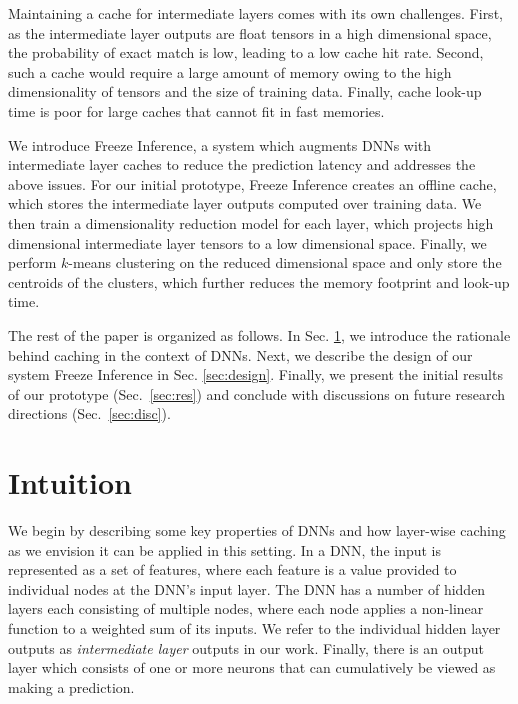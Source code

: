 \documentclass[letterpaper,twocolumn,10pt]{article}
\newcommand{\adarsh}[1]{}
\renewcommand{\adarsh}[1]{{\color{brown}{\bf [AK: #1}]}}
\begin{document}
Maintaining a cache for intermediate layers comes with its own challenges. First, as the intermediate layer outputs are float tensors in a high dimensional space, the probability of exact match is low, leading to a low cache hit rate. Second, such a cache would require a large amount of memory owing to the high dimensionality of tensors and the size of training data. Finally, cache look-up time is poor for large caches that cannot fit in fast memories. 

We introduce Freeze Inference, a system which augments DNNs with intermediate layer caches to reduce the prediction latency and addresses the above issues. For our initial prototype, Freeze Inference creates an offline cache, which stores the intermediate layer outputs computed over training data. We then train a dimensionality reduction model for each layer, which projects high dimensional intermediate layer tensors to a low dimensional space. Finally, we perform $k$-means clustering on the reduced dimensional space and only store the centroids of the clusters, which further reduces the memory footprint and look-up time.             

The rest of the paper is organized as follows. In Sec. \ref{sec:Intuition}, we introduce the rationale behind caching in the context of DNNs. Next, we describe the design of our system Freeze Inference in Sec. \ref{sec:design}. Finally, we present the initial results of our prototype (Sec.~\ref{sec:res}) and conclude with discussions on future research directions (Sec.~\ref{sec:disc}).

\begin{comment}
Our contributions in this paper:\adarsh{discuss}
\begin{itemize}
  \item 
  \item 
  \item 
\end{itemize}
\end{comment}  

\section{Intuition}\label{sec:Intuition}
We begin by describing some key properties of DNNs and how layer-wise caching as we envision it can be applied in this setting. In a DNN, the input is represented as a set of features, where each feature is a value provided to individual nodes at the DNN's input layer. The DNN has a number of hidden layers each consisting of multiple nodes, where each node applies a non-linear function to a weighted sum of its inputs. We refer to the individual hidden layer outputs as {\it intermediate layer} outputs in our work. Finally, there is an output layer which consists of one or more neurons that can cumulatively be viewed as making a prediction.
\end{document}
